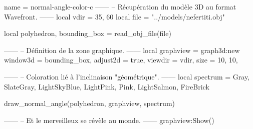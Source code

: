 \documentclass{standalone}
\begin{document}
\begin{luadraw}{name = normal-angle-color-c}
------
-- Récupération du modèle 3D au format Wavefront.
------
local vdir = {35, 60}
local file = "../models/nefertiti.obj"

local polyhedron, bounding_box = read_obj_file(file)

------
-- Définition de la zone graphique.
------
local graphview = graph3d:new{
  window3d = bounding_box,
  adjust2d = true,
  viewdir  = vdir,
  size     = {10, 10},
}

------
-- Coloration lié à l'inclinaison "géométrique".
------
local spectrum = {Gray, SlateGray, LightSkyBlue, LightPink, Pink, LightSalmon, FireBrick}

draw_normal_angle(polyhedron, graphview, spectrum)

------
-- Et le merveilleux se révèle au monde.
------
graphview:Show()
\end{luadraw}
\end{document}
